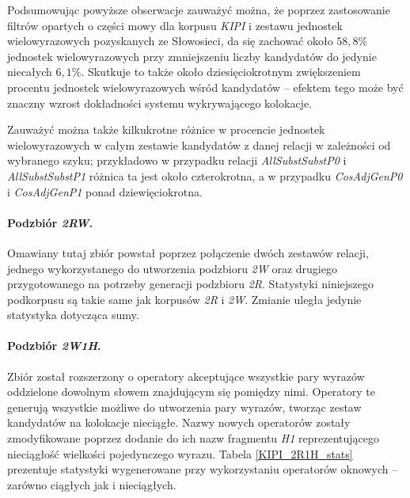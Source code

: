 \documentclass[11pt,a4paper]{llncs}
\begin{document}
\par
Podsumowując powyższe obserwacje zauważyć można, że poprzez zastosowanie filtrów opartych o części mowy dla korpusu \emph{KIPI} i zestawu jednostek wielowyrazowych pozyskanych ze Słowosieci, da się zachować około $ 58,8\% $ jednostek wielowyrazowych przy zmniejszeniu liczby kandydatów do jedynie niecałych $ 6,1\% $.
Skutkuje to także około dziesięciokrotnym zwiększeniem procentu jednostek wielowyrazowych wśród kandydatów -- efektem tego może być znaczny wzrost dokładności systemu wykrywającego kolokacje.

\par
Zauważyć można także kilkukrotne różnice w procencie jednostek wielowyrazowych w całym zestawie kandydatów z danej relacji w zależności od wybranego szyku; przykładowo w przypadku relacji \emph{AllSubstSubstP0} i \emph{AllSubstSubstP1} różnica ta jest około czterokrotna, a w przypadku \emph{CosAdjGenP0} i \emph{CosAdjGenP1} ponad dziewięciokrotna.


\paragraph{Podzbiór \protect\textit{2RW}.}
Omawiany tutaj zbiór powstał poprzez połączenie dwóch zestawów relacji, jednego wykorzystanego do utworzenia podzbioru \emph{2W} oraz drugiego przygotowanego na potrzeby generacji podzbioru \emph{2R}.
Statystyki niniejszego podkorpusu są takie same jak korpusów \emph{2R} i \emph{2W}.
Zmianie uległa jedynie statystyka dotycząca sumy.


\paragraph{Podzbiór \protect\textit{2W1H}.}
Zbiór został rozszerzony o operatory akceptujące wszystkie pary wyrazów oddzielone dowolnym słowem znajdującym się pomiędzy nimi.
Operatory te generują wszystkie możliwe do utworzenia pary wyrazów, tworząc zestaw kandydatów na kolokacje nieciągłe.
Nazwy nowych operatorów zostały zmodyfikowane poprzez dodanie do ich nazw fragmentu \emph{H1} reprezentującego nieciągłość wielkości pojedynczego wyrazu.
Tabela \ref{KIPI_2R1H_stats} prezentuje statystyki wygenerowane przy wykorzystaniu operatorów oknowych -- zarówno ciągłych jak i nieciągłych.
\end{document}
